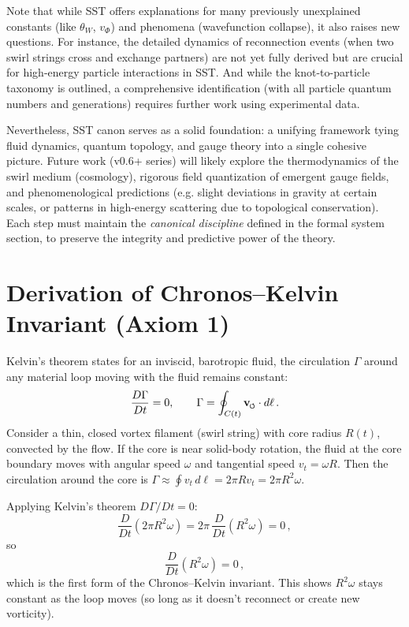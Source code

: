 \documentclass[reprint,aps,onecolumn,nofootinbib]{revtex4-2}
\newcommand{\swirlarrow}{%
    \mathchoice{\mkern-2mu\scriptstyle\boldsymbol{\circlearrowleft}}%
    {\mkern-2mu\scriptstyle\boldsymbol{\circlearrowleft}}%
    {\mkern-2mu\scriptscriptstyle\boldsymbol{\circlearrowleft}}%
    {\mkern-2mu\scriptscriptstyle\boldsymbol{\circlearrowleft}}%
}
\newcommand{\vswirl}{\mathbf{v}_{\swirlarrow}}
\begin{document}
    Note that while SST offers explanations for many previously unexplained constants (like $\theta_W$, $v_{\Phi}$) and phenomena (wavefunction collapse), it also raises new questions. For instance, the detailed dynamics of reconnection events (when two swirl strings cross and exchange partners) are not yet fully derived but are crucial for high-energy particle interactions in SST. And while the knot-to-particle taxonomy is outlined, a comprehensive identification (with all particle quantum numbers and generations) requires further work using experimental data.

    Nevertheless, SST canon \canonversion serves as a solid foundation: a unifying framework tying fluid dynamics, quantum topology, and gauge theory into a single cohesive picture. Future work (v0.6+ series) will likely explore the thermodynamics of the swirl medium (cosmology), rigorous field quantization of emergent gauge fields, and phenomenological predictions (e.g. slight deviations in gravity at certain scales, or patterns in high-energy scattering due to topological conservation). Each step must maintain the \emph{canonical discipline} defined in the formal system section, to preserve the integrity and predictive power of the theory.


    \appendix
\section{Derivation of Chronos–Kelvin Invariant (Axiom 1)}
    Kelvin’s theorem states for an inviscid, barotropic fluid, the circulation $\Gamma$ around any material loop moving with the fluid remains constant:
    \[
        \frac{D\Gamma}{Dt} = 0, \qquad \Gamma = \oint_{C(t)} \vswirl \cdot d\ell\,.
    \]
    Consider a thin, closed vortex filament (swirl string) with core radius $R(t)$, convected by the flow. If the core is near solid-body rotation, the fluid at the core boundary moves with angular speed $\omega$ and tangential speed $v_t = \omega R$. Then the circulation around the core is $\Gamma \approx \oint v_t\,d\ell = 2\pi R v_t = 2\pi R^2 \omega$.

    Applying Kelvin’s theorem $D\Gamma/Dt=0$:
    \[
        \frac{D}{Dt}(2\pi R^2 \omega) = 2\pi\,\frac{D}{Dt}(R^2 \omega) = 0\,,
    \]
    so
    \[
        \frac{D}{Dt}(R^2 \omega) = 0\,,
    \]
    which is the first form of the Chronos–Kelvin invariant. This shows $R^2 \omega$ stays constant as the loop moves (so long as it doesn’t reconnect or create new vorticity).
\end{document}
